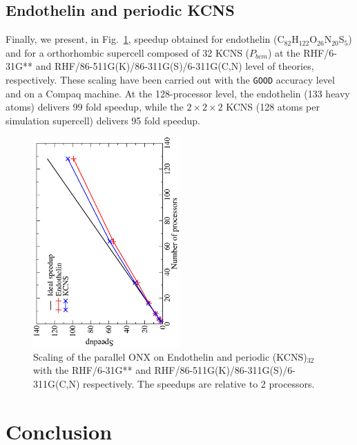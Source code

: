 \documentclass[twocolumn,showkeys,showpacs,preprintnumbers,amsmath,amssymb]{revtex4}
\begin{document}
\subsection{Endothelin and periodic KCNS}
Finally, we present, in Fig.~\ref{fig:Endothelin_KCNS}, speedup obtained for 
endothelin (C$_{82}$H$_{122}$O$_{26}$N$_{20}$S$_5$) and
for a orthorhombic supercell composed of 32 KCNS ($P_{bcm}$)
at the RHF/6-31G** and RHF/86-511G(K)/86-311G(S)/6-311G(C,N) 
level of theories, respectively.
These scaling have been carried out with the {\tt GOOD} accuracy level 
and on a Compaq machine.
At the 128-processor level, the endothelin (133 heavy atoms) delivers 99 fold
speedup, while the $2\times 2\times 2$ KCNS (128 atoms per simulation supercell)
delivers 95 fold speedup. 


\begin{figure}[p]
  \centering
  \caption{\protect
    Scaling of the parallel ONX on Endothelin and periodic (KCNS)$_32$ with 
    the RHF/6-31G** and RHF/86-511G(K)/86-311G(S)/6-311G(C,N) respectively.
    The speedups are relative to 2 processors.
  }\label{fig:Endothelin_KCNS}
  \begin{center}
    \includegraphics[angle=-90,width=0.5\textwidth]{Endothelin_KCNS}
  \end{center}
\end{figure}



\section{Conclusion}\label{Sec:Conc}
\end{document}
